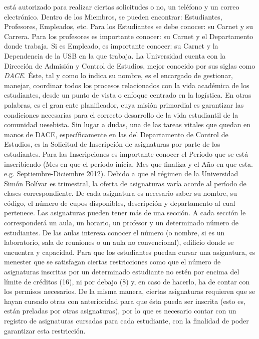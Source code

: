 \message{ !name(InformeFase2.tex)}\documentclass[12pt,a4paper,spanish]{article}
\begin{document}
est\'a autorizado para realizar ciertas solicitudes o no, un
tel\'efono y un correo electr\'onico. Dentro de los Miembros, se
pueden encontrar: Estudiantes, Profesores, Empleados, etc. Para los
Estudiantes se debe conocer: su Carnet y su Carrera. Para los
profesores es importante conocer: su Carnet y el Departamento donde
trabaja. Si es Empleado, es importante conocer: su Carnet y la
Dependencia de la USB en la que trabaja. 
\newline
\newline 
\indent La Universidad cuenta con la Direcci\'on de Admisi\'on y
Control de Estudios, mejor conocido por sus siglas como
\emph{DACE}. \'Este, tal y como lo indica su nombre, es el encargado
de gestionar, manejar, coordinar todos los procesos relacionados con
la vida acad\'emica de los estudiantes, desde un punto de vista o
enfoque centrado en la log\'istica. En otras palabras, es el gran ente
planificador, cuya misi\'on primordial es garantizar las condiciones
necesarias para el correcto desarrollo de la vida estudiantil de la
comunidad uesebista. Sin lugar a dudas, una de las tareas vitales que
quedan en manos de DACE, espec\'ificamente en las del Departamento de
Control de Estudios, es la Solicitud de Inscripci\'on de asignaturas
por parte de los estudiantes. Para las Inscripciones es importante
conocer el Per\'iodo que se est\'a inscribiendo (Mes en que el
per\'iodo inicia, Mes que finaliza y el A\~no en que
esta. e.g. Septiembre-Diciembre 2012).
\newline
\newline
\indent Debido a que el r\'egimen de la Universidad Sim\'on Bol\'ivar es
trimestral, la oferta de asignaturas var\'ia acorde al per\'iodo de
clases correspondiente. De cada asignatura es necesario saber su
nombre, su c\'odigo, el n\'umero de cupos disponibles, descripci\'on y
departamento al cual pertenece. Las asignaturas pueden tener m\'as de
una secci\'on. A cada secci\'on le corresponder\'a un aula, un horario,
un profesor y un determinado n\'umero de estudiantes. De las aulas interesa conocer el n\'umero (o nombre, si es un laboratorio, sala de reuniones o un aula no convencional), edificio donde se encuentra y capacidad. 
\newline
\newline	
\indent Para que los estudiantes puedan cursar una asignatura, es menester que se satisfagan ciertas restricciones como que el n\'umero de asignaturas inscritas por un determinado estudiante no est\'en por encima del l\'imite de cr\'editos (16), ni por debajo (8) y, en caso de hacerlo, ha de contar con los permisos necesarios. De la misma manera, ciertas asignaturas requieren que se hayan cursado otras con anterioridad para que \'esta pueda ser inscrita (esto es, est\'an preladas por otras asignaturas), por lo que es necesario contar con un registro de asignaturas cursadas para cada estudiante, con la finalidad de poder garantizar esta restricci\'on.
\end{document}
